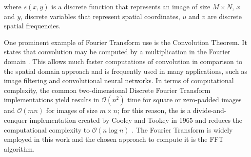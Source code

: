 \noindent where $s(x,y)$ is a discrete function that represents an image of size $M \times N$, $x$ and $y$, discrete variables that represent spatial coordinates, $u$ and $v$ are discrete spatial frequencies. 

One prominent example of Fourier Transform use is the Convolution Theorem. It states that convolution may be computed by a multiplication in the Fourier domain \cite{brigham1988fast}. This allows much faster computations of convolution in comparison to the spatial domain approach and is frequently used in many applications, such as image filtering and convolutional neural networks. In terms of computational complexity, the common two-dimensional Discrete Fourier Transform implementations yield results in $\mathcal{O}(n^{2})$ time for square or zero-padded images and $\mathcal{O}(mn)$ for images of size $m \times n$; for this reason, the  is a divide-and-conquer implementation created by Cooley and Tookey in 1965 and reduces the computational complexity to $\mathcal{O}(n \log n)$ \cite{bracewell2000fourier}. The Fourier Transform is widely employed in this work and the chosen approach to compute it is the FFT algorithm.







